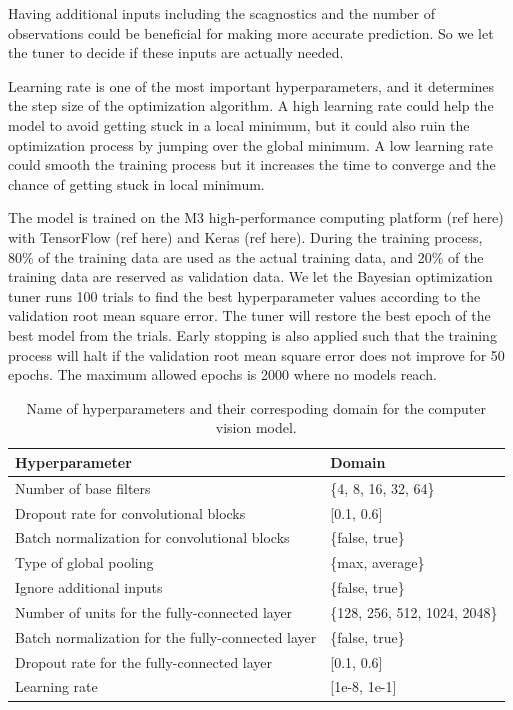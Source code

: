 \documentclass[]{interact}
\theoremstyle{plain}%
\theoremstyle{definition}
\theoremstyle{remark}
\begin{document}
Having additional inputs including the scagnostics and the number of
observations could be beneficial for making more accurate prediction. So
we let the tuner to decide if these inputs are actually needed.

Learning rate is one of the most important hyperparameters, and it
determines the step size of the optimization algorithm. A high learning
rate could help the model to avoid getting stuck in a local minimum, but
it could also ruin the optimization process by jumping over the global
minimum. A low learning rate could smooth the training process but it
increases the time to converge and the chance of getting stuck in local
minimum.

The model is trained on the M3 high-performance computing platform (ref
here) with TensorFlow (ref here) and Keras (ref here). During the
training process, 80\% of the training data are used as the actual
training data, and 20\% of the training data are reserved as validation
data. We let the Bayesian optimization tuner runs 100 trials to find the
best hyperparameter values according to the validation root mean square
error. The tuner will restore the best epoch of the best model from the
trials. Early stopping is also applied such that the training process
will halt if the validation root mean square error does not improve for
50 epochs. The maximum allowed epochs is 2000 where no models reach.

\begin{table}

\caption{\label{tab:hyperparameter}Name of hyperparameters and their correspoding domain for the computer vision model.}
\centering
\begin{tabular}[t]{ll}
\toprule
Hyperparameter & Domain\\
\midrule
Number of base filters & \{4, 8, 16, 32, 64\}\\
Dropout rate for convolutional blocks & {}[0.1, 0.6]\\
Batch normalization for convolutional blocks & \{false, true\}\\
Type of global pooling & \{max, average\}\\
Ignore additional inputs & \{false, true\}\\
\addlinespace
Number of units for the fully-connected layer & \{128, 256, 512, 1024, 2048\}\\
Batch normalization for the fully-connected layer & \{false, true\}\\
Dropout rate for the fully-connected layer & {}[0.1, 0.6]\\
Learning rate & {}[1e-8, 1e-1]\\
\bottomrule
\end{tabular}
\end{table}
\end{document}
